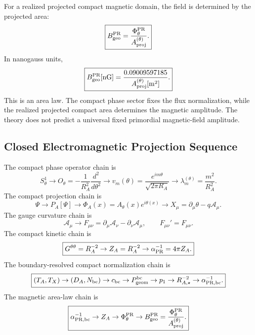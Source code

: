 \documentclass[11pt]{article}
\begin{document}
For a realized projected compact magnetic domain, the field is determined by
the projected area:
\begin{equation}
\boxed{
B_{\rm geo}^{\rm PR}
=
\frac{
\Phi_\theta^{\rm PR}
}{
A_{\rm proj}^{(\theta)}
}.
}
\end{equation}
In nanogauss units,
\begin{equation}
\boxed{
B_{\rm geo}^{\rm PR}[{\rm nG}]
=
\frac{
0.09009597185
}{
A_{\rm proj}^{(\theta)}[{\rm m}^2]
}.
}
\end{equation}
This is an area law. The compact phase sector fixes the flux normalization, while
the realized projected compact area determines the magnetic amplitude. The theory
does not predict a universal fixed primordial magnetic-field amplitude.

\subsection{Closed Electromagnetic Projection Sequence}

The compact phase operator chain is
\begin{equation}
\boxed{
S^1_\theta
\rightarrow
O_\theta
=
-\frac{1}{R_A^2}
\frac{d^2}{d\theta^2}
\rightarrow
v_m(\theta)
=
\frac{e^{im\theta}}{\sqrt{2\pi R_A}}
\rightarrow
\lambda_m^{(\theta)}
=
\frac{m^2}{R_A^2}.
}
\end{equation}
The compact projection chain is
\begin{equation}
\boxed{
\Psi
\rightarrow
P_A[\Psi]
\rightarrow
\Phi_A(x)
=
A_\theta(x)e^{i\theta(x)}
\rightarrow
X_\mu
=
\partial_\mu\theta-q\mathcal A_\mu.
}
\end{equation}
The gauge curvature chain is
\begin{equation}
\boxed{
\mathcal A_\mu
\rightarrow
F_{\mu\nu}
=
\partial_\mu\mathcal A_\nu
-
\partial_\nu\mathcal A_\mu,
\qquad
F_{\mu\nu}'=F_{\mu\nu}.
}
\end{equation}
The compact kinetic chain is
\begin{equation}
\boxed{
G^{\theta\theta}=R_A^{-2}
\rightarrow
Z_A=R_A^{-2}
\rightarrow
\alpha_{\rm PR}^{-1}
=
4\pi Z_A.
}
\end{equation}
The boundary-resolved compact normalization chain is
\begin{equation}
\boxed{
(T_A,T_X)
\rightarrow
(D_A,N_{\rm bc})
\rightarrow
c_{\rm bc}
\rightarrow
P_{\rm geom}^{\rm bc}
\rightarrow
p_1
\rightarrow
R_{A,\star}^{-2}
\rightarrow
\alpha_{\rm PR,bc}^{-1}.
}
\end{equation}
The magnetic area-law chain is
\begin{equation}
\boxed{
\alpha_{\rm PR,bc}^{-1}
\rightarrow
Z_A
\rightarrow
\Phi_\theta^{\rm PR}
\rightarrow
B_{\rm geo}^{\rm PR}
=
\frac{\Phi_\theta^{\rm PR}}
     {A_{\rm proj}^{(\theta)}}.
}
\end{equation}
\end{document}
